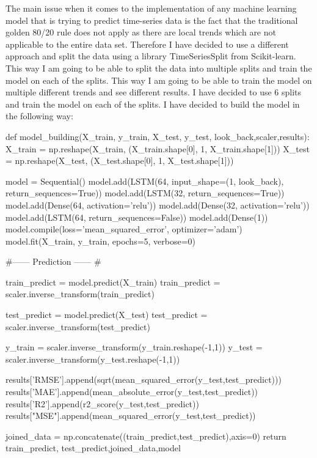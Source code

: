 \documentclass{imc-inf}
\begin{document}
	The main issue when it comes to the implementation of any machine learning model that is trying to predict time-series data is the fact that the traditional golden 80/20 rule does not apply as
	there are local trends which are not applicable to the entire data set. Therefore I have decided to use a different approach and split the data using a library TimeSeriesSplit from Scikit-learn.
	This way I am going to be able to split the data into multiple splits and train the model on each of the splits. This way I am going to be able to train the model on multiple different trends and
	see different results.
	I have decided to use 6 splits and train the model on each of the splits.
	I have decided to build the model in the following way:
	\begin{code}[language=Python, caption={LSTM Model Building}]
		
		def model_building(X_train, y_train, X_test, y_test, look_back,scaler,results):   
			X_train = np.reshape(X_train, (X_train.shape[0], 1, X_train.shape[1]))
			X_test = np.reshape(X_test, (X_test.shape[0], 1, X_test.shape[1]))
			
			model = Sequential()
			model.add(LSTM(64, input_shape=(1, look_back), return_sequences=True))
			model.add(LSTM(32, return_sequences=True))
			model.add(Dense(64, activation='relu'))
			model.add(Dense(32, activation='relu'))
			model.add(LSTM(64, return_sequences=False))
			model.add(Dense(1))
			model.compile(loss='mean_squared_error', optimizer='adam')
			model.fit(X_train, y_train, epochs=5, verbose=0)
			
			#------ Prediction ------ #
			
			train_predict = model.predict(X_train)
			train_predict = scaler.inverse_transform(train_predict)
			
			test_predict = model.predict(X_test)
			test_predict = scaler.inverse_transform(test_predict)
			
			y_train = scaler.inverse_transform(y_train.reshape(-1,1))
			y_test = scaler.inverse_transform(y_test.reshape(-1,1))
			
			results['RMSE'].append(sqrt(mean_squared_error(y_test,test_predict)))
			results['MAE'].append(mean_absolute_error(y_test,test_predict))
			results['R2'].append(r2_score(y_test,test_predict))
			results["MSE"].append(mean_squared_error(y_test,test_predict))
			
			joined_data = np.concatenate((train_predict,test_predict),axis=0)
			return train_predict, test_predict,joined_data,model
	\end{code}
	
\end{document}
